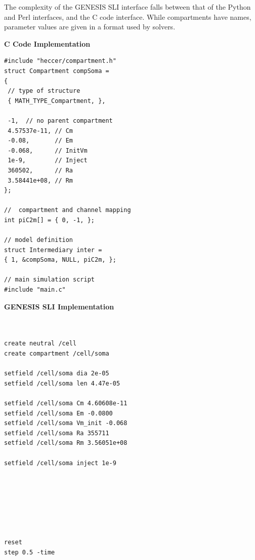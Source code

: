 \documentclass[12pt]{article}
\begin{document}
The complexity of the GENESIS SLI interface falls between that of the
Python and Perl interfaces, and the C code interface.  While compartments have
names, parameter values are given in a format used by solvers.

{\vspace*{1mm} \footnotesize
  \begin{minipage}{1\linewidth}
    
    \begin{minipage}[t]{.50\linewidth}
{\bf C Code Implementation}
\resetlinenumber
\begin{verbatim}
#include "heccer/compartment.h"
struct Compartment compSoma =
{
 // type of structure
 { MATH_TYPE_Compartment, },

 -1,  // no parent compartment
 4.57537e-11, // Cm
 -0.08,       // Em
 -0.068,      // InitVm
 1e-9,        // Inject
 360502,      // Ra
 3.58441e+08, // Rm
};

//  compartment and channel mapping
int piC2m[] = { 0, -1, };

// model definition
struct Intermediary inter =
{ 1, &compSoma, NULL, piC2m, };

// main simulation script
#include "main.c"

\end{verbatim}
    \end{minipage}
    \begin{minipage}[t]{.50\linewidth}
{\bf GENESIS SLI Implementation}
\resetlinenumber
\begin{verbatim}


create neutral /cell
create compartment /cell/soma

setfield /cell/soma dia 2e-05
setfield /cell/soma len 4.47e-05

setfield /cell/soma Cm 4.60608e-11
setfield /cell/soma Em -0.0800
setfield /cell/soma Vm_init -0.068
setfield /cell/soma Ra 355711
setfield /cell/soma Rm 3.56051e+08

setfield /cell/soma inject 1e-9







reset
step 0.5 -time
\end{verbatim}
    \end{minipage}
  \end{minipage}
  \linenumbers
  \vspace*{1mm}
}
\end{document}
